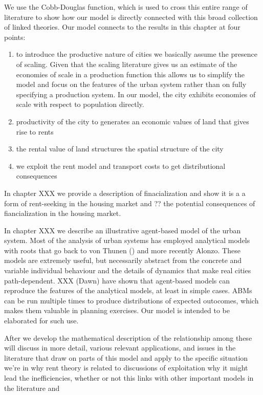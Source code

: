 We use the Cobb-Douglas function, which is used to cross this entire range of literature to show how our  model is directly connected with this broad collection of linked theories. Our model connects to the results in this chapter at four points:
\begin{enumerate}
    \item to introduce  the productive nature of cities we basically assume the presence of scaling. Given  that the scaling literature gives us an estimate of the economies of scale in a production function this allows us to simplify the model and focus on the features of the urban system rather than on fully specifying a production system. In our model, the city  exhibits economies of scale with respect to population directly. 

     \item  productivity of the city to generates an economic values of land that gives rise to rents

    \item  the rental value of land structures the spatial structure of the city

    \item we exploit the rent model and transport costs to get  distributional consequences
\end{enumerate}
 
In chapter XXX we  provide a description of finacialization and show it is a a form of rent-seeking in the housing market and ?? the potential consequences of fiancialization in the housing market. 

In chapter XXX we  describe an illustrative agent-based model of the urban system. Most of the analysis of urban systems has employed analytical models with roots that go back to von Thunen () and more recently Alonzo. These models are extremely useful, but necessarily abstract from the concrete  and variable individual behaviour and  the details  of dynamics that make real cities path-dependent. XXX (Dawn) have shown that agent-based models can reproduce the features of the analytical models, at least in simple cases. ABMs can be run multiple times to produce distributions of expected outocomes, which makes them valuable in planning exercises.  Our model is intended to be elaborated  for such use. 

After we develop the mathematical description of the relationship among these will discuss in more detail, various relevant applications, and issues in the literature that draw on parts of this model and apply to the specific situation we're in why rent theory is related to discussions of exploitation why it might lead the inefficiencies, whether or not this links with other important models in the literature and 


\color{black}
